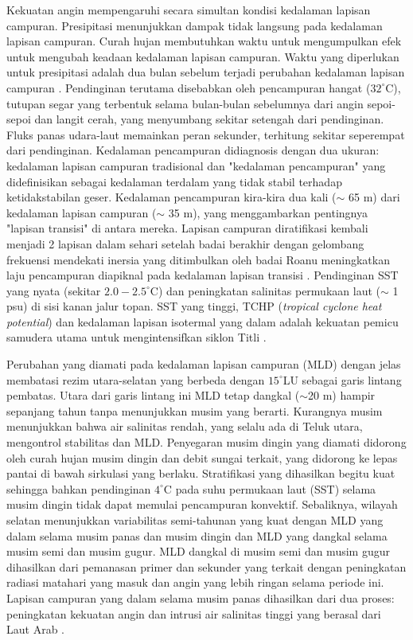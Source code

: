 \begin{spacing}{1.5}
	Kekuatan angin mempengaruhi secara simultan kondisi kedalaman lapisan campuran. Presipitasi menunjukkan dampak tidak langsung pada kedalaman lapisan campuran. Curah hujan membutuhkan waktu untuk mengumpulkan efek untuk mengubah keadaan kedalaman lapisan campuran. Waktu yang diperlukan untuk presipitasi adalah dua bulan sebelum terjadi perubahan kedalaman lapisan campuran  . Pendinginan terutama disebabkan oleh pencampuran hangat ($32^\circ$C), tutupan segar yang terbentuk selama bulan-bulan sebelumnya dari angin sepoi-sepoi dan langit cerah, yang menyumbang sekitar setengah dari pendinginan. Fluks panas udara-laut memainkan peran sekunder, terhitung sekitar seperempat dari pendinginan. Kedalaman pencampuran didiagnosis dengan dua ukuran: kedalaman lapisan campuran tradisional dan "kedalaman pencampuran" yang didefinisikan sebagai kedalaman terdalam yang tidak stabil terhadap ketidakstabilan geser. Kedalaman pencampuran kira-kira dua kali ($\sim$ 65 m) dari kedalaman lapisan campuran ($\sim$ 35 m), yang menggambarkan pentingnya "lapisan transisi" di antara mereka. Lapisan campuran diratifikasi kembali menjadi 2 lapisan dalam sehari setelah badai berakhir dengan gelombang frekuensi mendekati inersia yang ditimbulkan oleh badai Roanu meningkatkan laju pencampuran diapiknal pada kedalaman lapisan transisi . Pendinginan SST yang nyata (sekitar $2.0 - 2.5^\circ$C) dan peningkatan salinitas permukaan laut ($\sim$ 1 psu) di sisi kanan jalur topan. SST yang tinggi, TCHP (\textit{tropical cyclone heat potential}) dan kedalaman lapisan isotermal yang dalam adalah kekuatan pemicu samudera utama untuk mengintensifkan siklon Titli .
	
	Perubahan yang diamati pada kedalaman lapisan campuran (MLD) dengan jelas membatasi rezim utara-selatan yang berbeda dengan $15^\circ$LU sebagai garis lintang pembatas. Utara dari garis lintang ini MLD tetap dangkal ($\sim$20 m) hampir sepanjang tahun tanpa menunjukkan musim yang berarti. Kurangnya musim menunjukkan bahwa air salinitas rendah, yang selalu ada di Teluk utara, mengontrol stabilitas dan MLD. Penyegaran musim dingin yang diamati didorong oleh curah hujan musim dingin dan debit sungai terkait, yang didorong ke lepas pantai di bawah sirkulasi yang berlaku. Stratifikasi yang dihasilkan begitu kuat sehingga bahkan pendinginan $4^\circ$C pada suhu permukaan laut (SST) selama musim dingin tidak dapat memulai pencampuran konvektif. Sebaliknya, wilayah selatan menunjukkan variabilitas semi-tahunan yang kuat dengan MLD yang dalam selama musim panas dan musim dingin dan MLD yang dangkal selama musim semi dan musim gugur. MLD dangkal di musim semi dan musim gugur dihasilkan dari pemanasan primer dan sekunder yang terkait dengan peningkatan radiasi matahari yang masuk dan angin yang lebih ringan selama periode ini. Lapisan campuran yang dalam selama musim panas dihasilkan dari dua proses: peningkatan kekuatan angin dan intrusi air salinitas tinggi yang berasal dari Laut Arab . 
	

\end{spacing}
